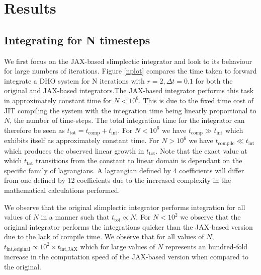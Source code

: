 \documentclass[10pt]{iopart}
\begin{document}
\section{Results}
\subsection{Integrating for N timesteps}
We first focus on the JAX-based slimplectic integrator and look to its behaviour for large numbers of iterations. Figure \ref{nplot} compares the time taken to forward integrate a DHO system for N iterations with $r=2, \Delta t = 0.1$ for both the original and JAX-based integrators.The JAX-based integrator performs this task in approximately constant time for $N<10^6$. This is due to the fixed time cost of JIT compiling the system with the integration time being linearly proportional to $N$, the number of time-steps. The total integration time for the integrator can therefore be seen as $t_{\textrm{tot}} = t_{\textrm{comp}} + t_{\textrm{int}}$. For $N<10^6$ we have $t_{\textrm{comp}} \gg t_{\textrm{int}}$ which exhibits itself as approximately constant time. For $N > 10^6$ we have $t_{\textrm{compile}} \ll t_{\textrm{int}}$ which produces the observed linear growth in $t_{\textrm{tot}}$.
Note that the exact value at which $t_{\textrm{tot}}$ transitions from the constant to linear domain is dependant on the specific family of lagrangians. A lagrangian defined by 4 coefficients will differ from one defined by 12 coefficients due to the increased complexity in the mathematical calculations performed.

We observe that the original slimplectic integrator performs integration for all values of $N$ in a manner such that $t_{\textrm{tot}} \propto N$. For $N<10^2$ we observe that the original integrator performs the integrations quicker than the JAX-based version due to the lack of compile time. We observe that for all values of $N$, $t_{\textrm{int,original}} \propto 10^2\times t_{\textrm{int,JAX}}$ which for large values of $N$ represents an hundred-fold increase in the computation speed of the JAX-based version when compared to the original.
\end{document}
